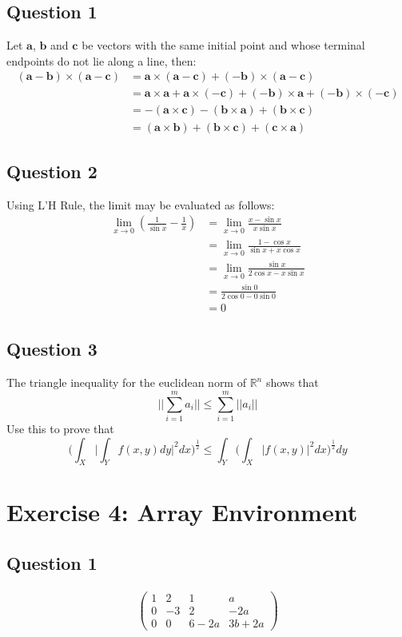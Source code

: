 \documentclass[12pt]{article}
\begin{document}
\subsection{Question 1}
Let $\textbf{a}$, $\textbf{b}$ and $\textbf{c}$ be vectors with the same initial point and whose terminal endpoints do not lie along a line, then:
\begin{align*}
    (\textbf{a}-\textbf{b})\times(\textbf{a}-\textbf{c})&=\textbf{a}\times(\textbf{a}-\textbf{c})+(-\textbf{b})\times(\textbf{a}-\textbf{c})\\
    &=\textbf{a}\times\textbf{a}+\textbf{a}\times(-\textbf{c})+(-\textbf{b})\times\textbf{a}+(-\textbf{b})\times(-\textbf{c})\\
    &=-(\textbf{a}\times\textbf{c})-(\textbf{b}\times\textbf{a})+(\textbf{b}\times\textbf{c})\\
    &=(\textbf{a}\times\textbf{b})+(\textbf{b}\times\textbf{c})+(\textbf{c}\times\textbf{a})
\end{align*}
\subsection{Question 2}
Using L'H Rule, the limit may be evaluated as follows:
\begin{align*}
    \lim_{x\to 0}(\frac{1}{\sin x}-\frac{1}{x})&=\lim_{x\to 0}\frac{x-\sin x}{x\sin x}\\
    &=\lim_{x\to 0}\frac{1-\cos x}{\sin x+x\cos x}\\
    &=\lim_{x\to 0}\frac{\sin x}{2\cos x-x\sin x}\\
    &=\frac{\sin 0}{2\cos 0-0\sin 0}\\
    &=0
\end{align*}
\subsection{Question 3}
The triangle inequality for the euclidean norm of $\mathbb{R}^n$ shows that $$||\sum_{i=1}^ma_i||\leq \sum_{i=1}^m||a_i||$$
Use this to prove that $$\Bigg(\int_X\Bigg|\int_Y f(x,y)dy\Bigg|^2dx\Bigg)^{\frac{1}{2}}\leq \int_Y\Bigg( \int_X|f(x,y)|^2dx\Bigg)^\frac{1}{2}dy$$
\section{Exercise 4: Array Environment}
\subsection{Question 1}
\begin{align*}
    \left(
    \begin{array}{ccc|c}
        1 & 2 & 1 & a \\
        0 & -3 & 2 & -2a\\
        0 & 0 & 6-2a & 3b+2a
    \end{array}
    \right)
\end{align*}
\end{document}
